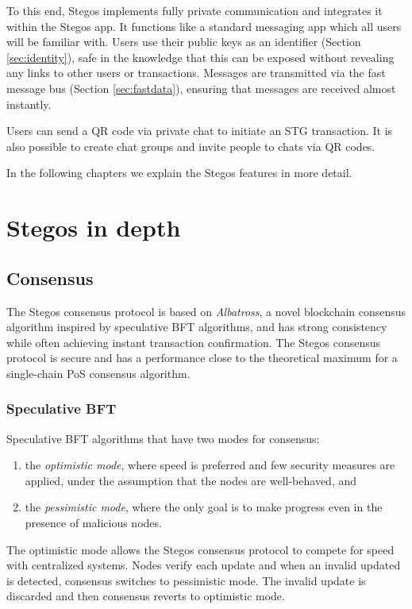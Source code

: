 \documentclass[8pt,fleqn,openany]{book}
\begin{document}
	To this end, Stegos implements fully private communication and integrates it within the Stegos app. It functions like a standard messaging app which all users will be familiar with. Users use their public keys as an identifier (Section \ref{sec:identity}), safe in the knowledge that this can be exposed without revealing any links to other users or transactions. Messages are transmitted via the fast message bus (Section \ref{sec:fastdata}), ensuring that messages are received almost instantly.
	
	Users can send a QR code via private chat to initiate an STG transaction. It is also possible to create chat groups and invite people to chats via QR codes. 
	
	In the following chapters we explain the Stegos features in more detail.
	
	\chapter{Stegos in depth}\label{chap:stegos-in-depth}
	
	\section{Consensus}
	The Stegos consensus protocol is based on \textit{Albatross}\cite{c23}, a novel blockchain consensus algorithm inspired by speculative BFT\cite{c9} algorithms, and has strong consistency while often achieving instant transaction confirmation. The Stegos consensus protocol is secure and has a performance close to the theoretical maximum for a single-chain PoS consensus algorithm.
	
	\subsection{Speculative BFT}
	Speculative BFT algorithms that have two modes for consensus: 
	
	\begin{enumerate}
		\item the \textit{optimistic mode}, where speed is preferred and few security measures are applied, under the assumption that the nodes are well-behaved, and
		\item the \textit{pessimistic mode}, where the only goal is to make progress even in the presence of malicious nodes.
	\end{enumerate}
	
	The optimistic mode allows the Stegos consensus protocol to compete for speed with centralized systems. Nodes verify each update and when an invalid updated is detected, consensus switches to pessimistic mode. The invalid update is discarded and then consensus reverts to optimistic mode.
	
\end{document}

